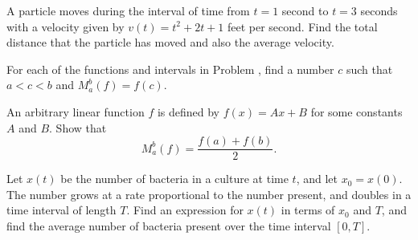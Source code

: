 \begin{exercises}
A particle moves during the interval of time
from $t=1$ second to $t=3$ seconds
with a velocity given by
$v(t) = t^2+2t+1$ feet per second.
Find the total distance that the particle
has moved and also the average velocity.

For each of the functions and intervals in
Problem , find a number $c$
such that $a<c<b$ and
$M_a^b(f) = f(c)$.

An arbitrary linear function $f$ is defined by
$f(x) = Ax+B$ for some constants
$A$ and $B$.  Show that
\[
M_a^b(f) = \frac{f(a)+f(b)}2
.
\]

Let $x(t)$ be the number of bacteria in a
culture at time $t$, and let $x_0=x(0)$.
The number grows at a rate proportional
to the number present, and doubles in a
time interval of length $T$.  Find an expression
for $x(t)$ in terms of $x_0$ and $T$,
and find the average number of bacteria
present over the time interval $[0,T]$.

\end{exercises}

